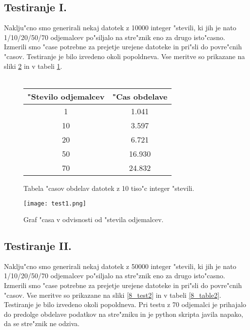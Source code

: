 \subsection{Testiranje I.}
Naklju"cno smo generirali nekaj datotek z 10000 integer "stevili, ki jih je nato 1/10/20/50/70 odjemalcev po"siljalo na stre"znik eno za drugo isto"casno. Izmerili smo "case potrebne za prejetje urejene datoteke in pri"sli do povre"cnih "casov. Testiranje je bilo izvedeno okoli popoldneva. Vse meritve so prikazane na sliki \ref{8_test1} in v tabeli \ref{8_table1}.\\\\

\begin{figure}
  \centering
  \begin{tabular}{ | c | c | }
    \hline
    "Stevilo odjemalcev & "Cas obdelave\\ \hline
	1 & 1.041 \\ \hline
    10 & 3.597 \\ \hline
    20 & 6.721 \\ \hline
    50 & 16.930 \\ \hline
    70 & 24.832 \\ \hline
  \end{tabular}
  \caption{Tabela "casov obdelav datotek z 10 tiso"c integer "stevili.}
  \label{8_table1}
  \centering
\end{figure}

\begin{figure}
  \centering
    \texttt{[image: test1.png]}
  \caption{Graf "casa v odvisnosti od "stevila odjemalcev.}
  \label{8_test1}  
\end{figure}

\subsection{Testiranje II.}
Naklju"cno smo generirali nekaj datotek z 50000 integer "stevili, ki jih je nato 1/10/20/50/70 odjemalcev po"siljalo na stre"znik eno za drugo isto"casno. Izmerili smo "case potrebne za prejetje urejene datoteke in pri"sli do povre"cnih "casov. Vse meritve so prikazane na sliki \ref{8_test2} in v tabeli \ref{8_table2}. Testiranje je bilo izvedeno okoli popoldneva. Pri testu z 70 odjemalci je prihajalo do predolge obdelave podatkov na stre"zniku in je python skripta javila napako, da se stre"znik ne odziva.\\\\

